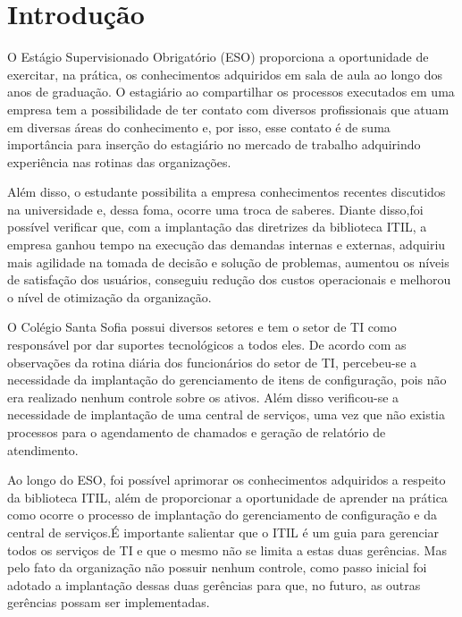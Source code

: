 \documentclass[eso]{bcc}
\begin{document}

\renewcommand\contentsname{\centerline{Sumário}}
\renewcommand\listfigurename{\centerline{Lista de Figuras}}
\renewcommand\listtablename{\centerline{Lista de Tabelas}}

\tableofcontents

\listoffigures
{}

\listoftables
{}

\inicio
\chapter{Introdução}

O Estágio Supervisionado Obrigatório (ESO)  proporciona a oportunidade de exercitar,  na prática, os conhecimentos adquiridos em sala de aula ao longo dos anos de graduação. O estagiário ao compartilhar os processos executados em uma empresa tem a possibilidade de ter contato com diversos profissionais que atuam em diversas áreas do conhecimento e, por isso, esse contato é de suma importância para inserção do estagiário no mercado de trabalho adquirindo experiência nas rotinas das organizações. 

Além disso, o estudante possibilita a empresa conhecimentos recentes  discutidos na universidade e, dessa foma, ocorre uma troca de saberes. Diante disso,foi possível verificar que, com a implantação das diretrizes da biblioteca ITIL, a empresa ganhou tempo na execução das demandas internas e externas, adquiriu mais agilidade na tomada de decisão e solução de problemas, aumentou os níveis de satisfação dos usuários, conseguiu redução dos custos operacionais e melhorou o nível de otimização da organização.


 O Colégio Santa Sofia possui diversos setores e tem o setor de TI como responsável por dar suportes tecnológicos  a todos eles.  De acordo com as observações da rotina  diária dos funcionários do setor de TI, percebeu-se a necessidade da implantação do gerenciamento de itens de configuração, pois não era realizado nenhum controle sobre os ativos. Além disso verificou-se a necessidade de implantação de uma central de serviços, uma vez que não existia processos para o agendamento de chamados e geração de relatório de atendimento.

Ao longo do ESO, foi possível aprimorar os conhecimentos adquiridos  a respeito da biblioteca ITIL, além de proporcionar a oportunidade de aprender na prática como ocorre o processo de implantação do gerenciamento de configuração e da central de serviços.É importante salientar que o ITIL é um guia para gerenciar todos os serviços de TI e que o mesmo não se limita a estas duas gerências. Mas pelo fato da organização não possuir nenhum controle, como passo inicial foi adotado a implantação dessas duas gerências para que, no futuro, as outras gerências possam ser implementadas.
\end{document}
